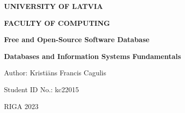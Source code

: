 \begin{titlepage}
    \thispagestyle{empty}
    \begin{center}
        \vspace*{2cm}
        \begin{large}\textbf{UNIVERSITY OF LATVIA}

            \textbf{FACULTY OF COMPUTING}

            \vfill
            \textbf{Free and Open-Source Software Database}
        \end{large}

        \vfill
        \textbf{Databases and Information Systems Fundamentals}
    \end{center}
    \vspace{4cm}
    \begin{flushright}
        Author: Kristiāns Francis Cagulis

        Student ID No.: kc22015

    \end{flushright}
    \vspace{1cm}
    \begin{center}
        RIGA 2023
    \end{center}
\end{titlepage}
